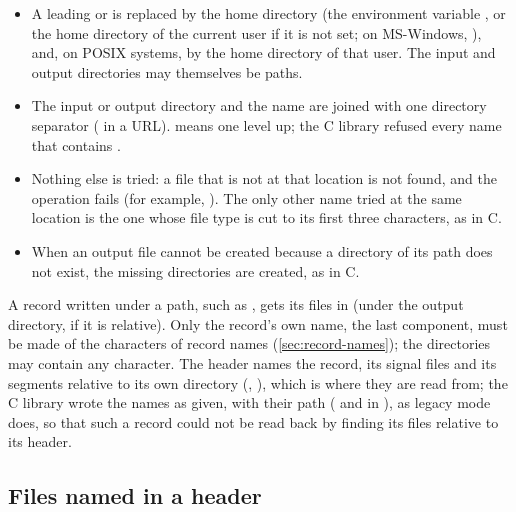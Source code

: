 \begin{itemize}
\item A leading \code{\textasciitilde} or \code{\textasciitilde/} is
  replaced by the home directory (the environment variable , or
  the home directory of the current user if it is not set; on MS-Windows,
  ), and, on POSIX systems,  by the home directory of that user. The input and output
  directories may themselves be \code{\textasciitilde} paths.
\item The input or output directory and the name are joined with one
  directory separator (\code{/} in a URL).  means one level up;
  the C library refused every name that contains .
\item Nothing else is tried: a file that is not at that location is not
  found, and the operation fails (for example, ). The only other name tried at the same location is the
  one whose file type is cut to its first three characters, as in C.
\item When an output file cannot be created because a directory of its path
  does not exist, the missing directories are created, as in C.
\end{itemize}
A record written under a path, such as , gets its files in
 (under the output directory, if it is relative). Only the
record's own name, the last component, must be made of the characters of
record names (\cref{sec:record-names}); the directories may contain any
character. The header names the record, its signal files and its segments
relative to its own directory (, ), which is where
they are read from; the C library wrote the names as given, with their path
( and  in ), as legacy
mode does, so that such a record could not be read back by finding its
files relative to its header.

\subsection{Files named in a header}
\label{sec:header-files}

